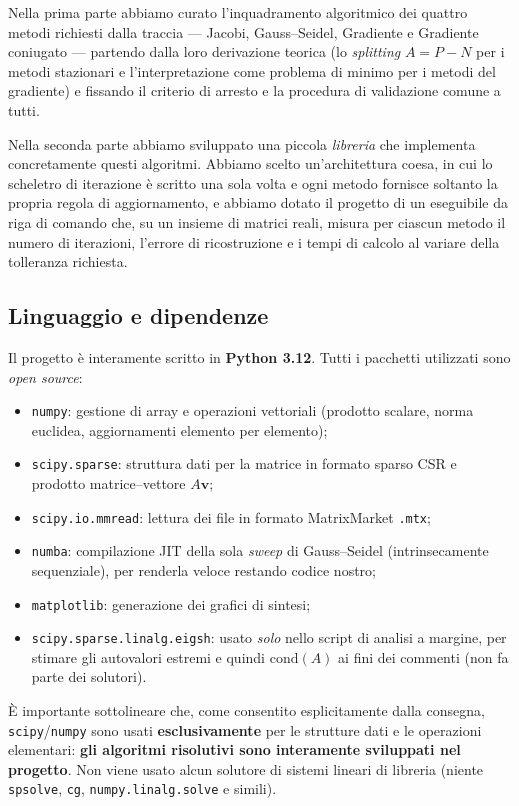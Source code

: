\documentclass[11pt,a4paper]{article}
\begin{document}
Nella prima parte abbiamo curato l'inquadramento algoritmico dei quattro metodi
richiesti dalla traccia --- Jacobi, Gauss--Seidel, Gradiente e Gradiente
coniugato --- partendo dalla loro derivazione teorica (lo \emph{splitting}
$A=P-N$ per i metodi stazionari e l'interpretazione come problema di minimo per i
metodi del gradiente) e fissando il criterio di arresto e la procedura di
validazione comune a tutti.

Nella seconda parte abbiamo sviluppato una piccola \emph{libreria} che implementa
concretamente questi algoritmi. Abbiamo scelto un'architettura coesa, in cui lo
scheletro di iterazione è scritto una sola volta e ogni metodo fornisce soltanto
la propria regola di aggiornamento, e abbiamo dotato il progetto di un eseguibile
da riga di comando che, su un insieme di matrici reali, misura per ciascun metodo
il numero di iterazioni, l'errore di ricostruzione e i tempi di calcolo al
variare della tolleranza richiesta.

\subsection{Linguaggio e dipendenze}
Il progetto è interamente scritto in \textbf{Python 3.12}. Tutti i pacchetti
utilizzati sono \emph{open source}:
\begin{itemize}[leftmargin=1.6em]
  \item \texttt{numpy}: gestione di array e operazioni vettoriali (prodotto
  scalare, norma euclidea, aggiornamenti elemento per elemento);
  \item \texttt{scipy.sparse}: struttura dati per la matrice in formato sparso
  CSR e prodotto matrice--vettore $A\mathbf{v}$;
  \item \texttt{scipy.io.mmread}: lettura dei file in formato MatrixMarket
  \texttt{.mtx};
  \item \texttt{numba}: compilazione JIT della sola \emph{sweep} di
  Gauss--Seidel (intrinsecamente sequenziale), per renderla veloce restando
  codice nostro;
  \item \texttt{matplotlib}: generazione dei grafici di sintesi;
  \item \texttt{scipy.sparse.linalg.eigsh}: usato \emph{solo} nello script di
  analisi a margine, per stimare gli autovalori estremi e quindi
  $\mathrm{cond}(A)$ ai fini dei commenti (non fa parte dei solutori).
\end{itemize}

È importante sottolineare che, come consentito esplicitamente dalla consegna,
\texttt{scipy}/\texttt{numpy} sono usati \textbf{esclusivamente} per le strutture
dati e le operazioni elementari: \textbf{gli algoritmi risolutivi sono
interamente sviluppati nel progetto}. Non viene usato alcun solutore di sistemi
lineari di libreria (niente \texttt{spsolve}, \texttt{cg},
\texttt{numpy.linalg.solve} e simili).
\end{document}
